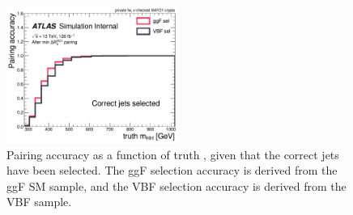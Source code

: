 \begin{figure}[b]
    \centering
    \includegraphics[width=0.5\textwidth]{figures/nr-int-note/selection/V2/acc_truth_mhh_exists_4b_only.pdf}
    \caption{Pairing accuracy as a function of truth \mhh, given that the correct jets have been selected. The ggF selection accuracy is derived from the ggF SM sample, and the VBF selection accuracy is derived from the VBF \kvv sample.}
    \label{fig:pairingAcc-mhh-exists-4b}
\end{figure}

\FloatBarrier

